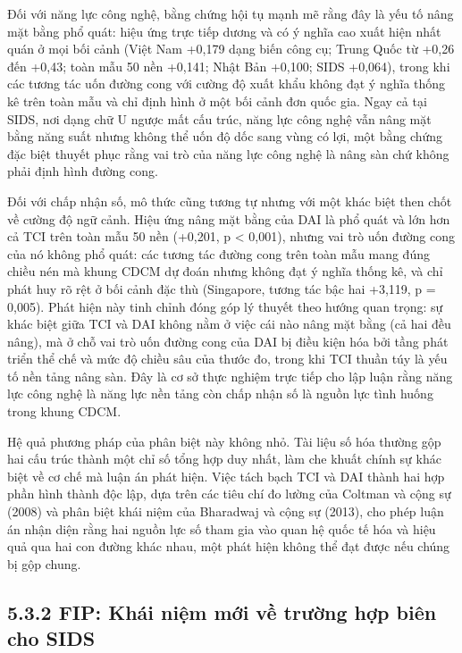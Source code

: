 \documentclass[
  a4paper,
  13pt]{extreport}
\begin{document}
Đối với năng lực công nghệ, bằng chứng hội tụ mạnh mẽ rằng đây là yếu tố
nâng mặt bằng phổ quát: hiệu ứng trực tiếp dương và có ý nghĩa cao xuất
hiện nhất quán ở mọi bối cảnh (Việt Nam +0,179 dạng biến công cụ; Trung
Quốc từ +0,26 đến +0,43; toàn mẫu 50 nền +0,141; Nhật Bản +0,100; SIDS
+0,064), trong khi các tương tác uốn đường cong với cường độ xuất khẩu
không đạt ý nghĩa thống kê trên toàn mẫu và chỉ định hình ở một bối cảnh
đơn quốc gia. Ngay cả tại SIDS, nơi dạng chữ U ngược mất cấu trúc, năng
lực công nghệ vẫn nâng mặt bằng năng suất nhưng không thể uốn độ dốc
sang vùng có lợi, một bằng chứng đặc biệt thuyết phục rằng vai trò của
năng lực công nghệ là nâng sàn chứ không phải định hình đường cong.

Đối với chấp nhận số, mô thức cũng tương tự nhưng với một khác biệt then
chốt về cường độ ngữ cảnh. Hiệu ứng nâng mặt bằng của DAI là phổ quát và
lớn hơn cả TCI trên toàn mẫu 50 nền (+0,201, p \textless{} 0,001), nhưng
vai trò uốn đường cong của nó không phổ quát: các tương tác đường cong
trên toàn mẫu mang đúng chiều nén mà khung CDCM dự đoán nhưng không đạt
ý nghĩa thống kê, và chỉ phát huy rõ rệt ở bối cảnh đặc thù (Singapore,
tương tác bậc hai +3,119, p = 0,005). Phát hiện này tinh chỉnh đóng góp
lý thuyết theo hướng quan trọng: sự khác biệt giữa TCI và DAI không nằm
ở việc cái nào nâng mặt bằng (cả hai đều nâng), mà ở chỗ vai trò uốn
đường cong của DAI bị điều kiện hóa bởi tầng phát triển thể chế và mức
độ chiều sâu của thước đo, trong khi TCI thuần túy là yếu tố nền tảng
nâng sàn. Đây là cơ sở thực nghiệm trực tiếp cho lập luận rằng năng lực
công nghệ là năng lực nền tảng còn chấp nhận số là nguồn lực tình huống
trong khung CDCM.

Hệ quả phương pháp của phân biệt này không nhỏ. Tài liệu số hóa thường
gộp hai cấu trúc thành một chỉ số tổng hợp duy nhất, làm che khuất chính
sự khác biệt về cơ chế mà luận án phát hiện. Việc tách bạch TCI và DAI
thành hai hợp phần hình thành độc lập, dựa trên các tiêu chí đo lường
của Coltman và cộng sự (2008) và phân biệt khái niệm của Bharadwaj và
cộng sự (2013), cho phép luận án nhận diện rằng hai nguồn lực số tham
gia vào quan hệ quốc tế hóa và hiệu quả qua hai con đường khác nhau, một
phát hiện không thể đạt được nếu chúng bị gộp chung.

\hypertarget{fip-khuxe1i-niux1ec7m-mux1edbi-vux1ec1-trux1b0ux1eddng-hux1ee3p-biuxean-cho-sids}{%
\subsection{5.3.2 FIP: Khái niệm mới về trường hợp biên cho
SIDS}\label{fip-khuxe1i-niux1ec7m-mux1edbi-vux1ec1-trux1b0ux1eddng-hux1ee3p-biuxean-cho-sids}}
\end{document}
